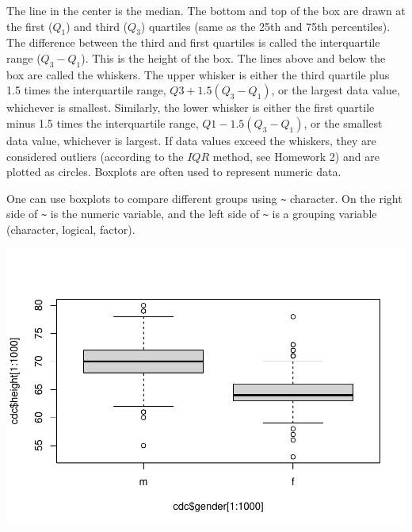 \documentclass[
]{book}
\newenvironment{Shaded}{\begin{snugshade}}{\end{snugshade}}
\newcommand{\DecValTok}[1]{\textcolor[rgb]{0.00,0.00,0.81}{#1}}
\newcommand{\KeywordTok}[1]{\textcolor[rgb]{0.13,0.29,0.53}{\textbf{#1}}}
\newcommand{\NormalTok}[1]{#1}
\newcommand{\OperatorTok}[1]{\textcolor[rgb]{0.81,0.36,0.00}{\textbf{#1}}}
\newcommand{\StringTok}[1]{\textcolor[rgb]{0.31,0.60,0.02}{#1}}
\begin{document}
The line in the center is the median. The bottom and top of the box are drawn at the first (\(Q_1\)) and third (\(Q_3\)) quartiles (same as the 25th and 75th percentiles). The difference between the third and first quartiles is called the interquartile range (\(Q_3-Q_1\)). This is the height of the box. The lines above and below the box are called the whiskers. The upper whisker is either the third quartile plus 1.5 times the interquartile range, \(Q3 +1.5(Q_3-Q_1)\), or the largest data value, whichever is smallest. Similarly, the lower whisker is either the first quartile minus 1.5 times the interquartile range, \(Q1-1.5(Q_3-Q_1)\), or the smallest data value, whichever is largest. If data values exceed the whiskers, they are considered outliers (according to the \(IQR\) method, see Homework 2) and are plotted as circles. Boxplots are often used to represent numeric data.

One can use boxplots to compare different groups using \texttt{\textasciitilde{}} character. On the right side of \texttt{\textasciitilde{}} is the numeric variable, and the left side of \texttt{\textasciitilde{}} is a grouping variable (character, logical, factor).

\begin{Shaded}
\end{Shaded}

\includegraphics{_main_files/figure-latex/unnamed-chunk-178-1.pdf}
\end{document}
